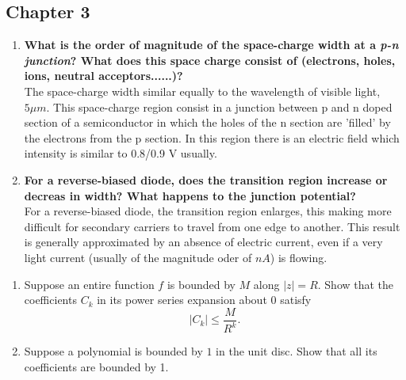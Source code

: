 \documentclass[12pt]{article}
\newcommand{\B}{\textbf}
\newcommand{\I}{\textit}
\newenvironment{problem}[2][Problem]{\begin{trivlist}
\item[\hskip \labelsep {\bfseries #1}\hskip \labelsep {\bfseries #2.}]}{\end{trivlist}}
\begin{document}
\subsection*{Chapter 3}
\begin{enumerate}
	\item[3.2] \B{What is the order of magnitude of the space-charge width at a \I{p-n junction}? What does this space charge consist of (electrons, holes, ions, neutral acceptors......)?}\\
	The space-charge width similar equally to the wavelength of visible light, $5 \mu m$. This space-charge region consist in a junction between p and n doped section of a semiconductor in which the holes of the n section are 'filled' by the electrons from the p section. In this region there is an electric field which intensity is similar to 0.8/0.9 V usually. 
	\item[3.2] \B{For a reverse-biased diode, does the transition region increase or decreas in width? What happens to the junction potential?}\\
	For a reverse-biased diode, the transition region enlarges, this making more difficult for secondary carriers to travel from one edge to another. This result is generally approximated by an absence of electric current, even if a very light current (usually of the magnitude oder of $nA$) is flowing. 
		 
\end{enumerate}





\newpage
\begin{problem}{6}
\begin{enumerate}[label=\alph*)]
    \item Suppose an entire function $f$ is bounded by $M$ along $|z|=R$. Show that the coefficients $C_k$ in its power series expansion about $0$ satisfy
    \[
    |C_k|\leq\frac{M}{R^k}.
    \]
    \item Suppose a polynomial is bounded by $1$ in the unit disc. Show that all its coefficients are bounded by 1.
\end{enumerate}
\end{problem}
\end{document}
